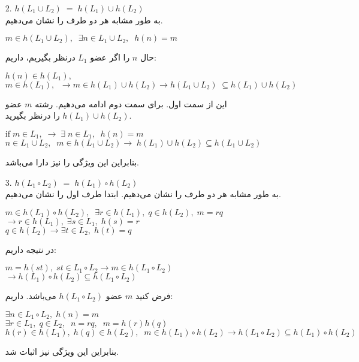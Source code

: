 \begin{itemize}
    \item[2. ]$h(L_1\cup L_2) \;=\; h(L_1)\cup h(L_2)$\\[0.1in]
    به طور مشابه هر دو طرف را نشان می‌دهیم.\newline
    \begin{center}
        $m\in h(L_1 \cup L_2),\;\; \exists n \in
         L_1\cup L_2, \;\; h(n)=m$\\
    \end{center}
    حال $n$ را اگر عضو $L_1$ درنظر بگیریم، داریم:
    \begin{center}
        $h(n)\in h(L_1),$\\
        $m\in h(L_1),\;\; \rightarrow m\in h(L_1)\cup h(L_2)
        \rightarrow h(L_1\cup L_2)\;\subseteq h(L_1) \cup h(L_2)$
    \end{center}
    این از سمت اول. برای سمت دوم ادامه می‌دهیم. رشته $m$ عضو $h(L_1)\cup 
    h(L_2)$ را درنظر بگیرید.
    \begin{center}
        $\text{if}\; m\in L_1,\;\rightarrow\; \exists \; n
        \in L_1,\;\; h(n)=m$\\
        $n\in L_1\cup L_2,\;\; m\in h(L_1\cup L_2)\rightarrow
        \;h(L_1)\cup h(L_2) \subseteq h(L_1 \cup L_2)$\\[0.1in]
    \end{center}
    بنابراین این ویژگی را نیز دارا می‌باشد.
    \item[3. ]$h(L_1\circ  L_2) \;=\; h(L_1)\circ h(L_2)$\\[0.1in]
    به طور مشابه هر دو طرف را نشان می‌دهیم.
    ابتدا طرف اول را نشان می‌دهیم.
    \newline
    \begin{center}
        $m \in h(L_1)\circ h(L_2),\;\;\exists r\in h(L_1),\;
        q \in h(L_2),\; m = rq$\\
        $\rightarrow
        r \in h(L_1),\; \exists s \in L_1,\; h(s) = r$\\
        $q \in h(L_2) \rightarrow\exists t \in L_2,\; h(t) = q$\\
    \end{center}
    در نتیجه داریم:
    \begin{center}
        $m=h(st),\; st\in L_1\circ L_2 \rightarrow m \in h(L_1\circ L_2)$\\
        $\rightarrow h(L_1) \circ h(L_2) \subseteq h(L_1\circ L_2)$\\[0.1in]
    \end{center}

    فرض کنید $m$ عضو $h(L_1\circ  L_2)$ می‌باشد.
    داریم:
    \begin{center}
        $\exists n \in L_1 \circ L_2,\; h(n) = m$\\
        $\exists r\in L_1,\; q\in L_2,\;\; n = rq,\;\;
        m = h(r)h(q)$\\
        $h(r)\in h(L_1),\; h(q)\in h(L_2),\;\;m\in h(L_1)\circ
        h(L_2) \rightarrow h(L_1\circ L_2) \subseteq h(L_1)\circ
        h(L_2)$\\
    \end{center}
    بنابراین این ویژگی نیز اثبات شد.\\[0.15in]
\end{itemize}
